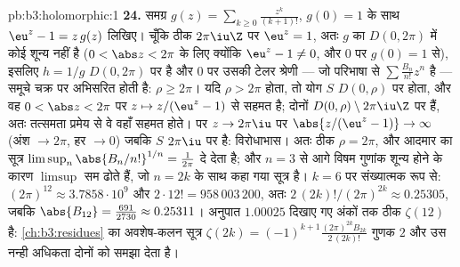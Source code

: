 \begin{solution}{pb:b3:holomorphic:1}
\textbf{24.} समग्र $g(z) =
\sum_{k\geq0}\frac{z^k}{(k+1)!}$, $g(0) = 1$ के साथ $\eu^z - 1 = z\,g(z)$ लिखिए। चूँकि ठीक $2\pi\iu\Z$
पर $\eu^z = 1$, अतः $g$ का $D(0, 2\pi)$ में कोई शून्य नहीं है ($0 < \abs z < 2\pi$ के लिए
क्योंकि $\eu^z - 1
\neq 0$, और $0$ पर $g(0) = 1$ से), इसलिए $h = 1/g$ $D(0,2\pi)$ पर 
है और $0$ पर उसकी टेलर श्रेणी --- जो परिभाषा से $\sum\frac{B_n}{n!}z^n$ है --- समूचे
चक्र पर अभिसरित होती है: $\rho \geq 2\pi$। यदि $\rho > 2\pi$ होता, तो योग $S$ $D(0,\rho)$
पर  होता, और वह $0 < \abs z < 2\pi$ पर $z
\mapsto z/(\eu^z - 1)$ से सहमत है; दोनों 
 $D(0,\rho) \setminus
2\pi\iu\Z$ पर  हैं, अतः तत्समता प्रमेय से वे वहाँ
सहमत होते। पर $z \to 2\pi\iu$ पर $\abs{z/(\eu^z - 1)} \to \infty$ (अंश $\to 2\pi$, हर $\to 0$) जबकि $S$ $2\pi\iu$
पर  है: विरोधाभास। अतः ठीक $\rho = 2\pi$, और आदमार का सूत्र $\limsup_n\abs{B_n/n!}^{1/n} = \frac1{2\pi}$ दे देता
है; और $n = 3$ से आगे विषम गुणांक शून्य होने के कारण $\limsup$ सम 
ढोते हैं, जो $n = 2k$ के साथ कहा गया सूत्र है। $k = 6$ पर संख्यात्मक रूप
से: $(2\pi)^{12} \approx
3.7858\cdot10^9$ और $2\cdot12! = 958\,003\,200$, अतः $2\,(2k)!/(2\pi)^{2k} \approx 0.25305$, जबकि $\abs{B_{12}} = \frac{691}{2730} \approx 0.25311$। अनुपात $1.00025$ दिखाए गए
अंकों तक ठीक $\zeta(12)$ है: \cref{ch:b3:residues} का अवशेष-कलन सूत्र $\zeta(2k) =
(-1)^{k+1}\frac{(2\pi)^{2k}B_{2k}}{2\,(2k)!}$ गुणक $2$ और
उस नन्ही अधिकता दोनों को समझा देता है।


\end{solution}
